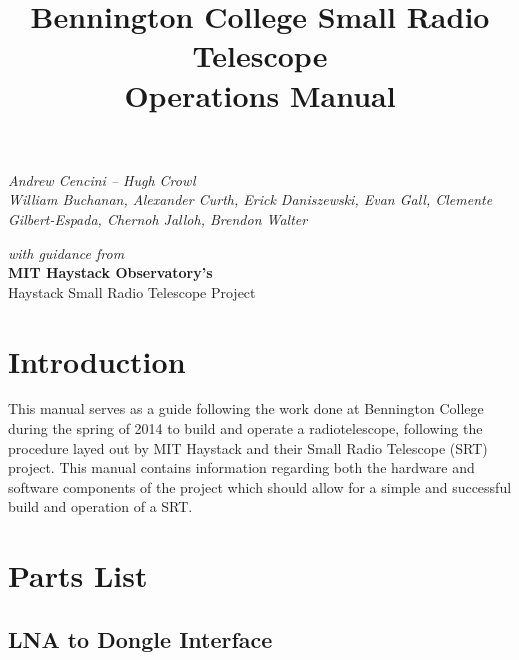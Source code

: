 \documentclass[11pt]{article} %
\title{\huge{Bennington College Small Radio Telescope} \\ Operations Manual}
\author{}
\date{} %
\begin{document}
\maketitle


\vspace{4cm}

\begin{center}
\emph{\Large{Andrew Cencini – Hugh Crowl} \\ 
\large{William Buchanan, Alexander Curth, Erick Daniszewski, Evan Gall,
Clemente Gilbert-Espada, Chernoh Jalloh, Brendon Walter}}
\end{center}


\vspace{7cm}

\begin{center}
\emph{with guidance from} \\ 
\Large{\textbf{MIT Haystack Observatory's}} \\ 
Haystack Small Radio Telescope Project
\end{center}
\normalsize

\tableofcontents

\newpage

\section{Introduction}

This manual serves as a guide following the work done at Bennington College during the spring of 2014 to build and operate a radiotelescope, following the procedure layed out by MIT Haystack and their Small Radio Telescope (SRT) project. This manual contains information regarding both the hardware and software components of the project which should allow for a simple and successful build and operation of a SRT.


\newpage

\section{Parts List}


\subsection{LNA to Dongle Interface}
\end{document}
